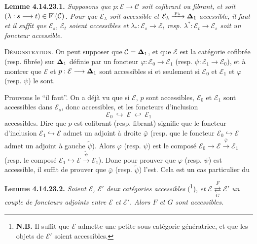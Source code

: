 \textbf{Lemme 4.14.23.1.} \textit{Supposons que $p:\mathcal{E}\longrightarrow\mathcal{C}$ soit cofibrant ou fibrant, et soit $(\lambda:s\longrightarrow t)\in\operatorname{Fl}(\mathcal{C})$. Pour que $\mathcal{E}_\lambda$ soit accessible et $\mathcal{E}_\lambda\xrightarrow{\;p_\lambda\;}\boldsymbol{\Delta}_1$ accessible, il faut et il suffit que $\mathcal{E}_s$, $\mathcal{E}_t$ soient accessibles et $\lambda_*:\mathcal{E}_s\longrightarrow\mathcal{E}_t$ resp. $\lambda^*:\mathcal{E}_t\longrightarrow\mathcal{E}_s$ soit un foncteur accessible.}

\textsc{Démonstration.} On peut supposer que $\mathcal{C}=\boldsymbol{\Delta}_1$, et que $\mathcal{E}$ est la catégorie cofibrée (resp. fibrée) sur $\boldsymbol{\Delta}_1$ définie par un foncteur $\varphi:\mathcal{E}_0\longrightarrow\mathcal{E}_1$ (resp. $\psi:\mathcal{E}_1\longrightarrow\mathcal{E}_0$), et à montrer que $\mathcal{E}$ et $p:\mathcal{E}\longrightarrow\boldsymbol{\Delta}_1$ sont accessibles si et seulement si $\mathcal{E}_0$ et $\mathcal{E}_1$ et $\varphi$ (resp. $\psi$) le sont.


Prouvons le “il faut”. On a déjà vu que si $\mathcal{E}$, $p$ sont accessibles, $\mathcal{E}_0$ et $\mathcal{E}_1$ sont accessibles dans $\mathcal{E}_s$, donc accessibles, et les foncteurs d'inclusion %
\[
\mathcal{E}_0\ \hookrightarrow\ \mathcal{E}\ \hookleftarrow\ \mathcal{E}_1
\]
accessibles. Dire que $p$ est cofibrant (resp. fibrant) signifie que le foncteur d'inclusion $\mathcal{E}_1\hookrightarrow\mathcal{E}$ admet un adjoint à droite $\bar{\varphi}$ (resp. que le foncteur $\mathcal{E}_0\hookrightarrow\mathcal{E}$ admet un adjoint à gauche $\tilde{\psi}$). Alors $\varphi$ (resp. $\psi$) est le composé $\mathcal{E}_0\longrightarrow\mathcal{E}\xrightarrow{\;\bar{\varphi}\;}\mathcal{E}_1$ (resp. le composé $\mathcal{E}_1\hookrightarrow\mathcal{E}\xrightarrow{\;\tilde{\psi}\;}\mathcal{E}_1$). Donc pour prouver que $\varphi$ (resp. $\psi$) est accessible, il suffit de prouver que $\bar{\varphi}$ (resp. $\tilde{\psi}$) l'est. Cela est un cas particulier du %

\textbf{Lemme 4.14.23.2.} \textit{Soient $\mathcal{E}$, $\mathcal{E}'$ deux catégories accessibles} (\footnote[172]{\textbf{N.B.} Il suffit que $\mathcal{E}$ admette une petite sous-catégorie génératrice, et que les objets de $\mathcal{E}'$ soient accessibles.}), \textit{et $\mathcal{E}\underset{G}{\overset{F}{\rightleftarrows}}\mathcal{E}'$ un couple de foncteurs adjoints entre $\mathcal{E}$ et $\mathcal{E}'$. Alors $F$ et $G$ sont accessibles.}

